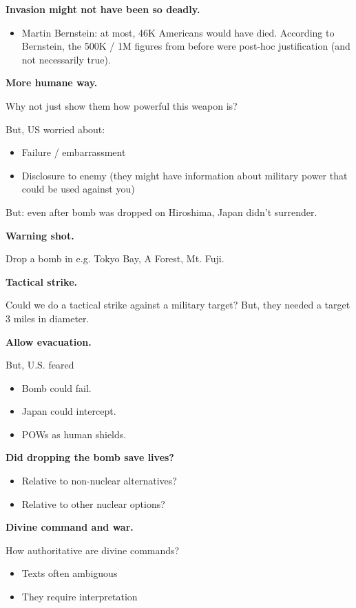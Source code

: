 \documentclass{article}
\begin{document}
{\bf Invasion might not have been so deadly.}

\begin{itemize}
  \item Martin Bernstein: at most, 46K Americans would have died.  According to Bernstein, the 500K / 1M figures from before were post-hoc justification (and not necessarily true).
\end{itemize}

{\bf More humane way.}

Why not just show them how powerful this weapon is?

But, US worried about:
\begin{itemize}
  \item Failure / embarrassment
  \item Disclosure to enemy (they might have information about military power that could be used against you)
\end{itemize}

But: even after bomb was dropped on Hiroshima, Japan didn't surrender.

{\bf Warning shot.}

Drop a bomb in e.g. Tokyo Bay, A Forest, Mt. Fuji.

{\bf Tactical strike.}

Could we do a tactical strike against a military target?  But, they needed a target 3 miles in diameter.

{\bf Allow evacuation.}

But, U.S. feared

\begin{itemize}
  \item Bomb could fail.
  \item Japan could intercept.
  \item POWs as human shields.
\end{itemize}

{\bf Did dropping the bomb save lives?}

\begin{itemize}
  \item Relative to non-nuclear alternatives?
  \item Relative to other nuclear options?
\end{itemize}

{\bf Divine command and war.}

How authoritative are divine commands?

\begin{itemize}
  \item Texts often ambiguous
  \item They require interpretation
\end{itemize}
\end{document}
